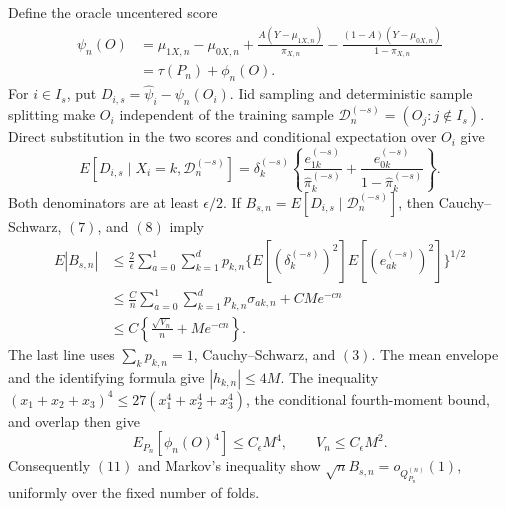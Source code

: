 Define the oracle uncentered score
\[
 \begin{aligned}
 \psi_n(O)
 &=\mu_{1X,n}-\mu_{0X,n}
 +\frac{A(Y-\mu_{1X,n})}{\pi_{X,n}}
 -\frac{(1-A)(Y-\mu_{0X,n})}{1-\pi_{X,n}}\\
 &=\tau(P_n)+\phi_n(O).
 \end{aligned}                                                     \tag{9}
\]
For \(i\in I_s\), put \(D_{i,s}=\widehat\psi_i-\psi_n(O_i)\).
Iid sampling and deterministic sample splitting make \(O_i\) independent
of the training sample \(\mathcal D_n^{(-s)}=(O_j:j\notin I_s)\).
Direct substitution in the two scores and conditional expectation over
\(O_i\) give
\[
 E[D_{i,s}\mid X_i=k,\mathcal D_n^{(-s)}]
 =\delta_k^{(-s)}\left\{
 \frac{e_{1k}^{(-s)}}{\widehat\pi_k^{(-s)}}
 +\frac{e_{0k}^{(-s)}}{1-\widehat\pi_k^{(-s)}}
 \right\}.                                                        \tag{10}
\]
Both denominators are at least \(\epsilon/2\).  If
\(B_{s,n}=E[D_{i,s}\mid\mathcal D_n^{(-s)}]\), then Cauchy--Schwarz,
\((7)\), and \((8)\) imply
\[
 \begin{aligned}
 E|B_{s,n}|
 &\le \frac{2}{\epsilon}\sum_{a=0}^1\sum_{k=1}^d p_{k,n}
    \{E[(\delta_k^{(-s)})^2]E[(e_{ak}^{(-s)})^2]\}^{1/2}\\
 &\le \frac Cn\sum_{a=0}^1\sum_{k=1}^d p_{k,n}\sigma_{ak,n}
       +CMe^{-cn}\\
 &\le C\left\{\frac{\sqrt{V_n}}n+Me^{-cn}\right\}.
 \end{aligned}                                                     \tag{11}
\]
The last line uses \(\sum_kp_{k,n}=1\), Cauchy--Schwarz, and \((3)\).
The mean envelope and the identifying formula give \(|h_{k,n}|\le4M\).
The inequality \((x_1+x_2+x_3)^4\le27(x_1^4+x_2^4+x_3^4)\), the
conditional fourth-moment bound, and overlap then give
\[
 E_{P_n}[\phi_n(O)^4]\le C_\epsilon M^4,
 \qquad V_n\le C_\epsilon M^2.                                    \tag{12}
\]
Consequently \((11)\) and Markov's inequality show
\(\sqrt n B_{s,n}=o_{Q_{P_n}^{(n)}}(1)\), uniformly over the fixed number
of folds.

